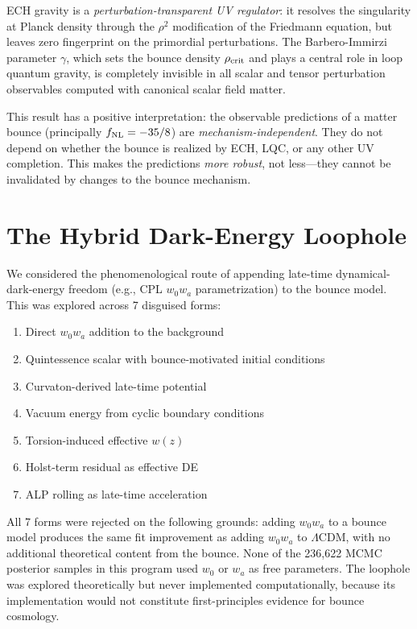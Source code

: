 \documentclass[a4paper,11pt]{article}
\newcommand{\fnl}{f_{\rm NL}}
\begin{document}
ECH gravity is a \emph{perturbation-transparent UV regulator}: it resolves the singularity at Planck density through the $\rho^2$ modification of the Friedmann equation, but leaves zero fingerprint on the primordial perturbations. The Barbero-Immirzi parameter $\gamma$, which sets the bounce density $\rho_{\rm crit}$ and plays a central role in loop quantum gravity, is completely invisible in all scalar and tensor perturbation observables computed with canonical scalar field matter.

This result has a positive interpretation: the observable predictions of a matter bounce (principally $\fnl = -35/8$) are \emph{mechanism-independent}. They do not depend on whether the bounce is realized by ECH, LQC, or any other UV completion. This makes the predictions \emph{more robust}, not less---they cannot be invalidated by changes to the bounce mechanism.

\section{The Hybrid Dark-Energy Loophole}

We considered the phenomenological route of appending late-time dynamical-dark-energy freedom (e.g., CPL $w_0w_a$ parametrization) to the bounce model. This was explored across 7 disguised forms:

\begin{enumerate}
\item Direct $w_0w_a$ addition to the background
\item Quintessence scalar with bounce-motivated initial conditions
\item Curvaton-derived late-time potential
\item Vacuum energy from cyclic boundary conditions
\item Torsion-induced effective $w(z)$
\item Holst-term residual as effective DE
\item ALP rolling as late-time acceleration
\end{enumerate}

All 7 forms were rejected on the following grounds: adding $w_0w_a$ to a bounce model produces the same fit improvement as adding $w_0w_a$ to $\Lambda$CDM, with no additional theoretical content from the bounce. None of the 236{,}622 MCMC posterior samples in this program used $w_0$ or $w_a$ as free parameters. The loophole was explored theoretically but never implemented computationally, because its implementation would not constitute first-principles evidence for bounce cosmology.
\end{document}
